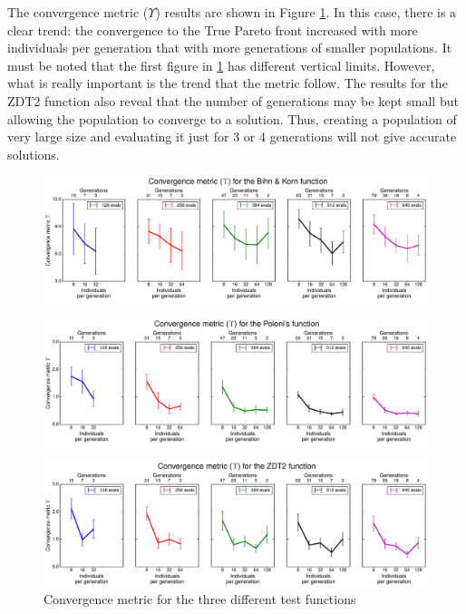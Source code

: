 The convergence metric ($\Upsilon$) results are shown in Figure \ref{fig:convMetric}. In this case, there is a clear trend: the convergence to the True Pareto front increased with more individuals per generation that with more generations of smaller populations. It must be noted that the first figure in \ref{fig:convMetric} has different vertical limits. However, what is really important is the trend that the metric follow. The results for the ZDT2 function also reveal that the number of generations may be kept small but allowing the population to converge to a solution. Thus, creating a population of very large size and evaluating it just for 3 or 4 generations will not give accurate solutions. 

    \newpage
    
    \begin{figure}[h!]
        \centering
        \includegraphics[width=\textwidth]{Figures/3/convMetric_BK.pdf}
    \end{figure}
    \begin{figure}[h!]
        \centering
        \includegraphics[width=\textwidth]{Figures/3/convMetric_POL.pdf}
    \end{figure}
    \begin{figure}[h!]
        \centering
        \includegraphics[width=\textwidth]{Figures/3/convMetric_ZDT.pdf}
        \caption{Convergence metric for the three different test functions}
        \label{fig:convMetric}
    \end{figure}
   
